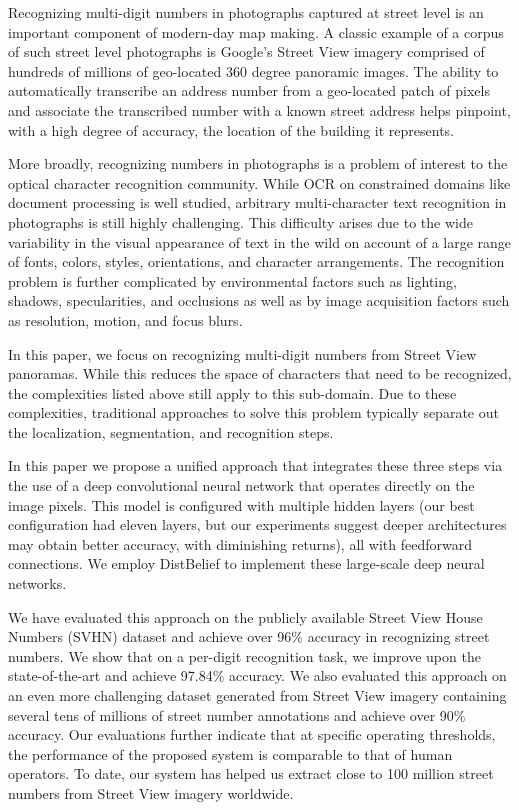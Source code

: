 \documentclass{article} \usepackage{comment}
\begin{document}
Recognizing multi-digit numbers in photographs captured at street level is an important component of modern-day map making. A classic example of a corpus of such street level photographs is Google's Street View imagery comprised of hundreds of millions of geo-located 360 degree panoramic images.
The ability to automatically transcribe an address number from a geo-located patch of pixels and associate the
transcribed number with a known street address helps pinpoint, with a high degree of accuracy, the location of the building it represents.  

More broadly, recognizing numbers in photographs is a problem of interest to the optical character recognition community. While OCR on constrained domains like document processing is well studied, arbitrary multi-character text recognition in photographs is still highly challenging. This difficulty arises due to the wide variability in the visual appearance of text in the wild on account of a large range of fonts, colors, styles, orientations, and character arrangements. The recognition problem is further complicated by environmental factors such as lighting, shadows, specularities, and occlusions as well as by image acquisition factors such as resolution, motion, and focus blurs. 

In this paper, we focus on recognizing multi-digit numbers from Street View panoramas.
While this reduces the space of characters that need to be recognized, the complexities listed above still apply to this sub-domain. Due to these complexities, traditional approaches to solve this problem typically separate out the localization, segmentation, and recognition steps.
   
In this paper we propose a unified approach that integrates these three steps via the use of a deep convolutional
neural network that operates directly on the image pixels.
This model is configured with multiple hidden layers (our best configuration had eleven layers, but our experiments
suggest deeper architectures may obtain better accuracy, with diminishing returns), all with feedforward
connections.
We employ DistBelief to implement these large-scale deep neural networks. 

We have evaluated this approach on the publicly available Street View House Numbers (SVHN) dataset and achieve over 96\% accuracy in recognizing street numbers. We show that on a per-digit recognition task, we improve upon the state-of-the-art and achieve 97.84\% accuracy. We also evaluated this approach on an even more challenging dataset generated from Street View imagery containing several tens of millions of street number annotations and achieve over 90\% accuracy. Our evaluations further indicate that at specific operating thresholds, the performance of the proposed system is comparable to that of human operators. To date, our system has helped us extract close to 100 million street numbers from Street View imagery worldwide.
\end{document}
